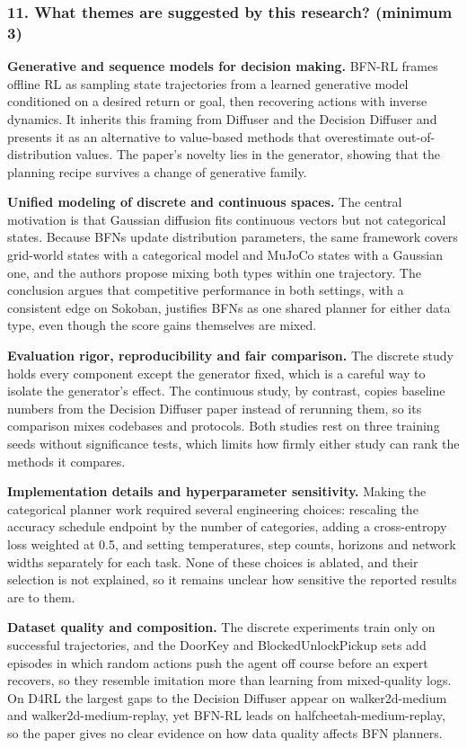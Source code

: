 \documentclass[11pt]{article}
\newcommand{\question}[1]{\subsubsection*{#1}}
\begin{document}
\question{11. What themes are suggested by this research? (minimum 3)}

\textbf{Generative and sequence models for decision making.} BFN-RL frames offline RL as sampling state trajectories from a learned generative model conditioned on a desired return or goal, then recovering actions with inverse dynamics. It inherits this framing from Diffuser and the Decision Diffuser and presents it as an alternative to value-based methods that overestimate out-of-distribution values. The paper's novelty lies in the generator, showing that the planning recipe survives a change of generative family.

\textbf{Unified modeling of discrete and continuous spaces.} The central motivation is that Gaussian diffusion fits continuous vectors but not categorical states. Because BFNs update distribution parameters, the same framework covers grid-world states with a categorical model and MuJoCo states with a Gaussian one, and the authors propose mixing both types within one trajectory. The conclusion argues that competitive performance in both settings, with a consistent edge on Sokoban, justifies BFNs as one shared planner for either data type, even though the score gains themselves are mixed.

\textbf{Evaluation rigor, reproducibility and fair comparison.} The discrete study holds every component except the generator fixed, which is a careful way to isolate the generator's effect. The continuous study, by contrast, copies baseline numbers from the Decision Diffuser paper instead of rerunning them, so its comparison mixes codebases and protocols. Both studies rest on three training seeds without significance tests, which limits how firmly either study can rank the methods it compares.

\textbf{Implementation details and hyperparameter sensitivity.} Making the categorical planner work required several engineering choices: rescaling the accuracy schedule endpoint by the number of categories, adding a cross-entropy loss weighted at 0.5, and setting temperatures, step counts, horizons and network widths separately for each task. None of these choices is ablated, and their selection is not explained, so it remains unclear how sensitive the reported results are to them.

\textbf{Dataset quality and composition.} The discrete experiments train only on successful trajectories, and the DoorKey and BlockedUnlockPickup sets add episodes in which random actions push the agent off course before an expert recovers, so they resemble imitation more than learning from mixed-quality logs. On D4RL the largest gaps to the Decision Diffuser appear on walker2d-medium and walker2d-medium-replay, yet BFN-RL leads on halfcheetah-medium-replay, so the paper gives no clear evidence on how data quality affects BFN planners.
\end{document}

